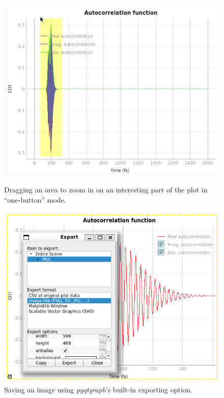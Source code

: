 \documentclass[12pt]{article}
\begin{document}
\begin{figure}[h]
    \centering
    \begin{minipage}[t]{.47\textwidth}
        \centering
        \includegraphics[width=\textwidth]{img/plot_drag.png}
        \caption{Dragging an area to zoom in on an interesting part of the plot in ``one-button'' mode.}
        \label{fig:plot_drag}
    \end{minipage}\hfill\begin{minipage}[t]{.47\textwidth}
        \centering
        \includegraphics[width=\textwidth]{img/plot_export.png}
        \caption{Saving an image using \textit{pyqtgraph}'s built-in exporting option.}
        \label{fig:plot_export}
    \end{minipage}
\end{figure}
\end{document}
